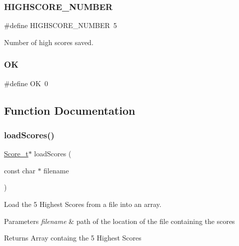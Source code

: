 \subsubsection{\texorpdfstring{H\+I\+G\+H\+S\+C\+O\+R\+E\+\_\+\+N\+U\+M\+B\+ER}{HIGHSCORE\_NUMBER}}
{\footnotesize\ttfamily \#define H\+I\+G\+H\+S\+C\+O\+R\+E\+\_\+\+N\+U\+M\+B\+ER~5}



Number of high scores saved. 

\hypertarget{group___highscores_gaba51915c87d64af47fb1cc59348961c9}{}\label{group___highscores_gaba51915c87d64af47fb1cc59348961c9} 
\subsubsection{\texorpdfstring{OK}{OK}}
{\footnotesize\ttfamily \#define OK~0}



\subsection{Function Documentation}
\hypertarget{group___highscores_ga860a7be33a6a7a627d2fafb624c9631f}{}\label{group___highscores_ga860a7be33a6a7a627d2fafb624c9631f} 
\subsubsection{\texorpdfstring{load\+Scores()}{loadScores()}}
{\footnotesize\ttfamily \hyperlink{struct_score__t}{Score\+\_\+t}$\ast$ load\+Scores (\begin{DoxyParamCaption}\item[{const char $\ast$}]{filename }\end{DoxyParamCaption})}



Load the 5 Highest Scores from a file into an array. 


\begin{DoxyParams}{Parameters}
{\em filename} & path of the location of the file containing the scores\\
\hline
\end{DoxyParams}
\begin{DoxyReturn}{Returns}
Array containg the 5 Highest Scores 
\end{DoxyReturn}
\hypertarget{group___highscores_ga8a07ce6e6865afe87235689a394378cc}{}\label{group___highscores_ga8a07ce6e6865afe87235689a394378cc} 
